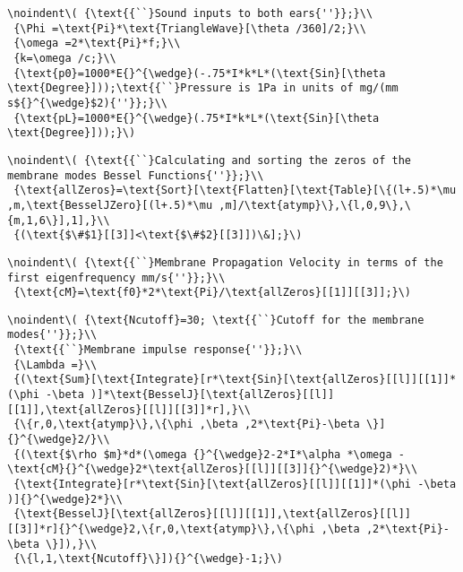 \begin{appendix}
\begin{verbatim}
\noindent\( {\text{{``}Sound inputs to both ears{''}};}\\
 {\Phi =\text{Pi}*\text{TriangleWave}[\theta /360]/2;}\\
 {\omega =2*\text{Pi}*f;}\\
 {k=\omega /c;}\\
 {\text{p0}=1000*E{}^{\wedge}(-.75*I*k*L*(\text{Sin}[\theta  \text{Degree}]));\text{{``}Pressure is 1Pa in units of mg/(mm s${}^{\wedge}$2){''}};}\\
 {\text{pL}=1000*E{}^{\wedge}(.75*I*k*L*(\text{Sin}[\theta  \text{Degree}]));}\)
\end{verbatim}

\begin{verbatim}
\noindent\( {\text{{``}Calculating and sorting the zeros of the membrane modes Bessel Functions{''}};}\\
 {\text{allZeros}=\text{Sort}[\text{Flatten}[\text{Table}[\{(l+.5)*\mu ,m,\text{BesselJZero}[(l+.5)*\mu ,m]/\text{atymp}\},\{l,0,9\},\{m,1,6\}],1],}\\
 {(\text{$\#$1}[[3]]<\text{$\#$2}[[3]])\&];}\)
\end{verbatim}

\begin{verbatim}
\noindent\( {\text{{``}Membrane Propagation Velocity in terms of the first eigenfrequency mm/s{''}};}\\
 {\text{cM}=\text{f0}*2*\text{Pi}/\text{allZeros}[[1]][[3]];}\)
\end{verbatim}

\begin{verbatim}
\noindent\( {\text{Ncutoff}=30; \text{{``}Cutoff for the membrane modes{''}};}\\
 {\text{{``}Membrane impulse response{''}};}\\
 {\Lambda =}\\
 {(\text{Sum}[\text{Integrate}[r*\text{Sin}[\text{allZeros}[[l]][[1]]*(\phi -\beta )]*\text{BesselJ}[\text{allZeros}[[l]][[1]],\text{allZeros}[[l]][[3]]*r],}\\
 {\{r,0,\text{atymp}\},\{\phi ,\beta ,2*\text{Pi}-\beta \}]{}^{\wedge}2/}\\
 {(\text{$\rho $m}*d*(\omega {}^{\wedge}2-2*I*\alpha *\omega -\text{cM}{}^{\wedge}2*\text{allZeros}[[l]][[3]]{}^{\wedge}2)*}\\
 {\text{Integrate}[r*\text{Sin}[\text{allZeros}[[l]][[1]]*(\phi -\beta )]{}^{\wedge}2*}\\
 {\text{BesselJ}[\text{allZeros}[[l]][[1]],\text{allZeros}[[l]][[3]]*r]{}^{\wedge}2,\{r,0,\text{atymp}\},\{\phi ,\beta ,2*\text{Pi}-\beta \}]),}\\
 {\{l,1,\text{Ncutoff}\}]){}^{\wedge}-1;}\)
\end{verbatim}


\end{appendix}
